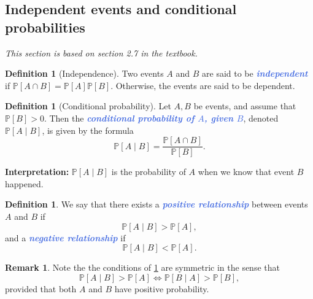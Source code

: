 \documentclass[10pt]{article}
\theoremstyle{definition}
\newtheorem{definition}[theorem]{Definition}
\newtheorem{remark}[theorem]{Remark}
\newcommand{\fl}{\noindent\textbf} %
\newcommand{\1}[1]{\textbf{1}_{\left[#1\right]}} %
\def\P{\mathbb{P}} %
\newcommand{\demph}[1]{\textcolor{RoyalBlue}{\textbf{\slshape #1}}} %
\begin{document}
\subsection{Independent events and conditional probabilities}
\textit{This section is based on section 2.7 in the textbook.}

\begin{definition}[Independence]
  \label{def:independence}
  Two events $A$ and $B$ are said to be \demph{independent} if $\P\left[A\cap
    B \right] = \P\left[A \right] \P\left[B \right]$. Otherwise, the events
  are said to be dependent.
\end{definition}

\begin{definition}[Conditional probability]
  Let $A,B$ be events, and assume that $\P\left[B\right]>0$. Then the
  \demph{conditional probability of $A$, given $B$}, denoted
  $\P\left[A\mid B \right]$, is given by the formula
  \begin{equation*}
    \P\left[A\mid B \right] = \frac{\P\left[A\cap B \right]}{\P\left[B \right]}.
  \end{equation*}
\end{definition}

\fl{Interpretation:} $\P\left[A\mid B \right]$ is the probability of $A$ when
we know that event $B$ happened.

\begin{definition}
  \label{def:positive-relationship}
  We say that there exists a \demph{positive relationship} between events $A$
  and $B$ if
  \begin{equation*}
    \P\left[A\mid B \right]> \P\left[A \right],
  \end{equation*}
  and a \demph{negative relationship} if
  \begin{equation*}
    \P\left[A\mid B \right]< \P\left[A \right].
  \end{equation*}
\end{definition}

\begin{remark}
  Note the the conditions of \cref{def:positive-relationship} are symmetric in
  the sense that
  \begin{equation*}
    \P\left[A\mid B \right]> \P\left[A \right] \iff \P\left[B\mid A \right]>
    \P\left[B \right],
  \end{equation*}
  provided that both $A$ and $B$ have positive probability.
\end{remark}
\end{document}
